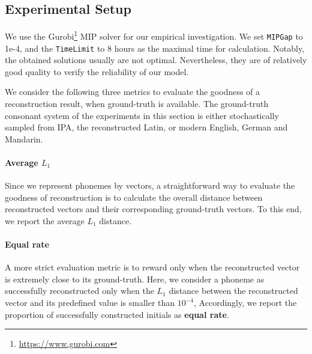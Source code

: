 \subsection{Experimental Setup} \label{sec:synthesis-setup}
We use the Gurobi\footnote{\url{https://www.gurobi.com}} MIP solver for our empirical investigation.
We set \texttt{MIPGap} to 1e-4, and the \texttt{TimeLimit} to 8 hours as the maximal time for calculation.%
Notably, the obtained solutions usually are not optimal. 
Nevertheless, they are of relatively good quality to verify the reliability of our model.


We consider the following three metrics to evaluate the goodness of a reconstruction result, when ground-truth is available.
The ground-truth consonant system of the experiments in this section is either stochastically sampled from IPA, the reconstructed Latin, or modern English, German and Mandarin.

\paragraph{Average $L_1$} Since we represent phonemes by vectors, a straightforward way to evaluate the goodness of reconstruction is to calculate the overall distance between reconstructed vectors and their corresponding ground-truth vectors. 
To this end, we report the average $L_1$ distance. %

\paragraph{Equal rate} A more strict evaluation metric is to reward only when the reconstructed vector is extremely close to its ground-truth. 
Here, we consider a phoneme as successfully reconstructed only when the $L_1$ distance between the reconstructed vector and its predefined value is smaller than $10^{-4}$,  
Accordingly, we report  the proportion of successfully constructed initials as \textbf{equal rate}.


